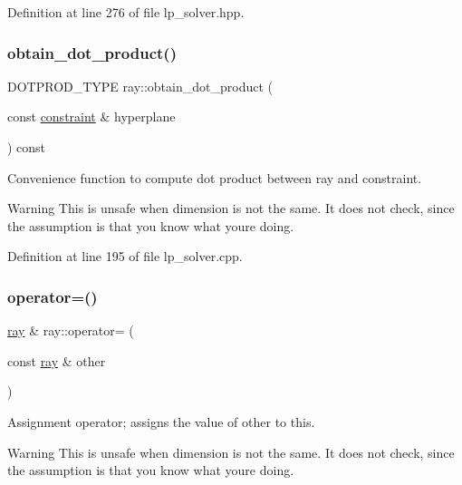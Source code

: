 Definition at line 276 of file lp\+\_\+solver.\+hpp.

\mbox{\label{classray_a25f56f0f7acafe000f98550af47b7da9}} 
\subsubsection{\texorpdfstring{obtain\+\_\+dot\+\_\+product()}{obtain\_dot\_product()}}
{\footnotesize\ttfamily D\+O\+T\+P\+R\+O\+D\+\_\+\+T\+Y\+PE ray\+::obtain\+\_\+dot\+\_\+product (\begin{DoxyParamCaption}\item[{const \hyperlink{classconstraint}{constraint} \&}]{hyperplane }\end{DoxyParamCaption}) const}



Convenience function to compute dot product between ray and constraint. 

\begin{DoxyWarning}{Warning}
This is unsafe when dimension is not the same. It does not check, since the assumption is that you know what you\textquotesingle{}re doing. 
\end{DoxyWarning}


Definition at line 195 of file lp\+\_\+solver.\+cpp.

\mbox{\label{classray_a83fa2d552fda75b973fe659c39ff9960}} 
\subsubsection{\texorpdfstring{operator=()}{operator=()}}
{\footnotesize\ttfamily \hyperlink{classray}{ray} \& ray\+::operator= (\begin{DoxyParamCaption}\item[{const \hyperlink{classray}{ray} \&}]{other }\end{DoxyParamCaption})}



Assignment operator; assigns the value of {\ttfamily other} to {\ttfamily this}. 

\begin{DoxyWarning}{Warning}
This is unsafe when dimension is not the same. It does not check, since the assumption is that you know what you\textquotesingle{}re doing. 
\end{DoxyWarning}


